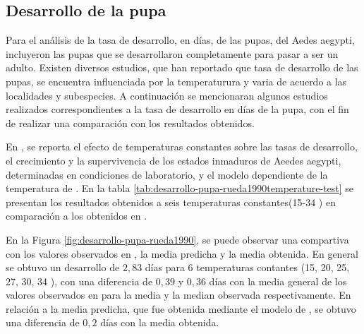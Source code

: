 \subsection{Desarrollo de la pupa}
Para el análisis de la tasa de desarrollo, en días, de las pupas, del Aedes aegypti, incluyeron
las pupas que se desarrollaron completamente para pasar a ser un adulto. Existen diversos
estudios, que han reportado que tasa de desarrollo de las pupas, se encuentra influenciada por la
temperaturura y varia de acuerdo a las localidades y subespecies. A continuación se mencionaran
algunos estudios realizados correspondientes a la tasa de desarrollo en días de la pupa, con el
fin de realizar una comparación con los resultados obtenidos.

En \cite{rueda1990temperature}, se reporta el efecto de temperaturas constantes sobre las tasas
de desarrollo, el crecimiento y la supervivencia de los estados inmaduros de Aeedes aegypti,
determinadas en condiciones de laboratorio, y el modelo dependiente de la temperatura de
\cite{sharpe1977reaction}. En la tabla \ref{tab:desarrollo-pupa-rueda1990temperature-test} se
presentan los resultados obtenidos a seis temperaturas constantes(15-34 \textcelsius) en
comparación a los obtenidos en \cite{rueda1990temperature}.

En la Figura \ref{fig:desarrollo-pupa-rueda1990}, se puede observar una compartiva con los
valores observados en \cite{rueda1990temperature}, la media predicha y la media obtenida. En
general se obtuvo un desarrollo de $2,83$ días para 6 temperaturas contantes (15, 20, 25, 27,
30, 34 \textcelsius), con una diferencia de $0,39$ y $0,36$ días con la media general de los
valores observados en \cite{rueda1990temperature} para la media y la median observada respectivamente. En relación a la media predicha, que fue obtenida mediante el modelo de
\cite{sharpe1977reaction}, se obtuvo una diferencia de $0,2$ días con la media obtenida.


